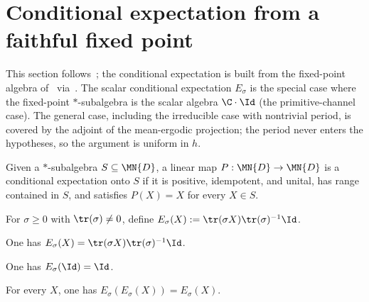 \section{Conditional expectation from a faithful fixed point}

This section follows~\cite[Section~6.4]{Wolf2012Quantum}; the conditional
expectation is built from the fixed-point algebra
of~\cite[Theorem~6.14]{Wolf2012Quantum}
via~\cite[(1.40)]{Wolf2012Quantum}.
The scalar conditional expectation $E_\sigma$ is the special case where
the fixed-point $*$-subalgebra is the scalar algebra $\C\cdot\Id$
(the primitive-channel case). The general case, including the irreducible
case with nontrivial period, is covered by the adjoint of the mean-ergodic
projection; the period never enters the hypotheses, so the argument is
uniform in $h$.

\begin{definition}\label{def:is_conditional_expectation}
    \leanok
    Given a $*$-subalgebra $S\subseteq\MN{D}$, a linear map
    $P:\MN{D}\to\MN{D}$ is a conditional expectation onto $S$ if it is
    positive, idempotent, and unital, has range contained in $S$, and
    satisfies $P(X)=X$ for every $X\in S$.
\end{definition}

\begin{definition}\label{def:scalar_conditional_expectation}
    \leanok
    For $\sigma\geq0$ with $\tr(\sigma)\neq0$, define
    $E_\sigma(X):=\tr(\sigma X)\tr(\sigma)^{-1}\Id$.
\end{definition}

\begin{lemma}\label{lem:scalar_conditional_expectation_apply}
    \leanok
    One has $E_\sigma(X)=\tr(\sigma X)\tr(\sigma)^{-1}\Id$.
\end{lemma}

\begin{lemma}[Unitality]\label{thm:scalar_conditional_expectation_unital}
    \leanok
    One has $E_\sigma(\Id)=\Id$.
\end{lemma}

\begin{lemma}[Idempotence]\label{thm:scalar_conditional_expectation_idempotent}
    \leanok
    For every $X$, one has $E_\sigma(E_\sigma(X))=E_\sigma(X)$.
\end{lemma}

